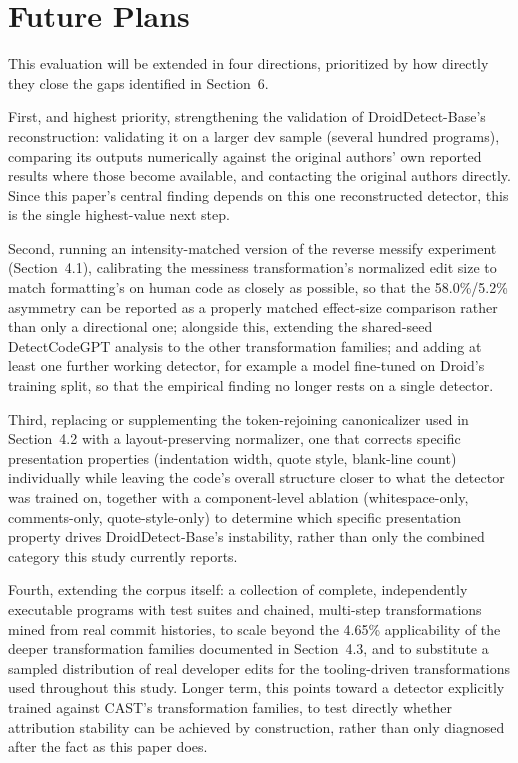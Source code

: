 \documentclass[sigconf,review,anonymous]{acmart}
\begin{document}
\section{Future Plans}

This evaluation will be extended in four directions, prioritized by how directly they close the gaps identified in Section~6.

First, and highest priority, strengthening the validation of DroidDetect-Base's reconstruction: validating it on a larger dev sample (several hundred programs), comparing its outputs numerically against the original authors' own reported results where those become available, and contacting the original authors directly. Since this paper's central finding depends on this one reconstructed detector, this is the single highest-value next step.

Second, running an intensity-matched version of the reverse messify experiment (Section~4.1), calibrating the messiness transformation's normalized edit size to match formatting's on human code as closely as possible, so that the 58.0\%/5.2\% asymmetry can be reported as a properly matched effect-size comparison rather than only a directional one; alongside this, extending the shared-seed DetectCodeGPT analysis to the other transformation families; and adding at least one further working detector, for example a model fine-tuned on Droid's training split, so that the empirical finding no longer rests on a single detector.

Third, replacing or supplementing the token-rejoining canonicalizer used in Section~4.2 with a layout-preserving normalizer, one that corrects specific presentation properties (indentation width, quote style, blank-line count) individually while leaving the code's overall structure closer to what the detector was trained on, together with a component-level ablation (whitespace-only, comments-only, quote-style-only) to determine which specific presentation property drives DroidDetect-Base's instability, rather than only the combined category this study currently reports.

Fourth, extending the corpus itself: a collection of complete, independently executable programs with test suites and chained, multi-step transformations mined from real commit histories, to scale beyond the 4.65\% applicability of the deeper transformation families documented in Section~4.3, and to substitute a sampled distribution of real developer edits for the tooling-driven transformations used throughout this study. Longer term, this points toward a detector explicitly trained against CAST's transformation families, to test directly whether attribution stability can be achieved by construction, rather than only diagnosed after the fact as this paper does.
\end{document}
